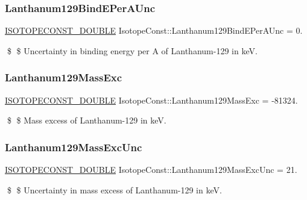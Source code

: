 \subsubsection{\texorpdfstring{Lanthanum129\+Bind\+E\+Per\+A\+Unc}{Lanthanum129BindEPerAUnc}}
{\footnotesize\ttfamily \mbox{\hyperlink{group___isotope_const-_macros_ga8f45a7272ce02c0b4c65c44636ed719a}{I\+S\+O\+T\+O\+P\+E\+C\+O\+N\+S\+T\+\_\+\+D\+O\+U\+B\+LE}} Isotope\+Const\+::\+Lanthanum129\+Bind\+E\+Per\+A\+Unc = 0.}

\$ \$ Uncertainty in binding energy per A of Lanthanum-\/129 in keV. \mbox{\label{group___isotope_const-_lanthanum-_la129_gac9f19ebae284e83fd92a626000a2b9d6}} 
\subsubsection{\texorpdfstring{Lanthanum129\+Mass\+Exc}{Lanthanum129MassExc}}
{\footnotesize\ttfamily \mbox{\hyperlink{group___isotope_const-_macros_ga8f45a7272ce02c0b4c65c44636ed719a}{I\+S\+O\+T\+O\+P\+E\+C\+O\+N\+S\+T\+\_\+\+D\+O\+U\+B\+LE}} Isotope\+Const\+::\+Lanthanum129\+Mass\+Exc = -\/81324.}

\$ \$ Mass excess of Lanthanum-\/129 in keV. \mbox{\label{group___isotope_const-_lanthanum-_la129_ga80743902d645f1f5369efbc0986af489}} 
\subsubsection{\texorpdfstring{Lanthanum129\+Mass\+Exc\+Unc}{Lanthanum129MassExcUnc}}
{\footnotesize\ttfamily \mbox{\hyperlink{group___isotope_const-_macros_ga8f45a7272ce02c0b4c65c44636ed719a}{I\+S\+O\+T\+O\+P\+E\+C\+O\+N\+S\+T\+\_\+\+D\+O\+U\+B\+LE}} Isotope\+Const\+::\+Lanthanum129\+Mass\+Exc\+Unc = 21.}

\$ \$ Uncertainty in mass excess of Lanthanum-\/129 in keV. \mbox{\label{group___isotope_const-_lanthanum-_la129_gabc8171213648dea98aa8de3eb91b094b}} 
